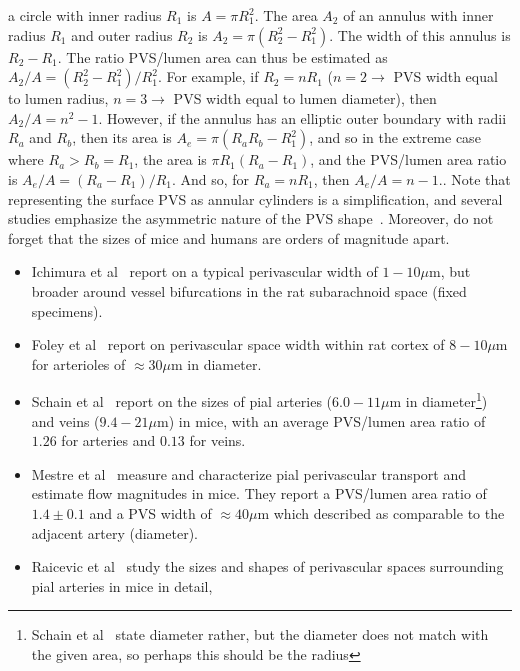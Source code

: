 \documentclass[fleqn,10pt]{wlscirep}
\begin{document}
\begin{enumerate}
{  a circle with inner radius $R_1$ is $A = \pi R_1^2$. The area $A_2$
  of an annulus with inner radius $R_1$ and outer radius $R_2$ is $A_2
  = \pi (R_2^2 - R_1^2)$. The width of this annulus is $R_2 -
  R_1$. The ratio PVS/lumen area can thus be estimated as $A_2/A =
  (R_2^2 - R_1^2)/R_1^2$. For example, if $R_2 = n R_1$ ($n = 2
  \rightarrow$ PVS width equal to lumen radius, $n = 3 \rightarrow$
  PVS width equal to lumen diameter), then $A_2/A = n^2 - 1$. However,
  if the annulus has an elliptic outer boundary with radii $R_a$ and
  $R_b$, then its area is $A_e = \pi (R_a R_b - R_1^2)$, and so in the
  extreme case where $R_a > R_b = R_1$, the area is $\pi R_1 (R_a -
  R_1)$, and the PVS/lumen area ratio is $A_e/A = (R_a -
  R_1)/R_1$. And so, for $R_a = n R_1$, then $A_e/A = n-1$.}. Note
  that representing the surface PVS as annular cylinders is a
  simplification, and several studies emphasize the asymmetric nature
  of the PVS shape~\cite{mestre2018flow, tithof2019hydraulic,
    vinje2021brain, raicevic2023sizes}. Moreover, do not forget that
  the sizes of mice and humans are orders of magnitude apart.
  \begin{itemize}
  \item
    Ichimura et al~\cite{ichimura1991distribution} report on a typical
    perivascular width of $1-10\mu$m, but broader around vessel
    bifurcations in the rat subarachnoid space (fixed specimens).
  \item Foley et al~\cite{foley2012realtime} report on perivascular
    space width within rat cortex of $8-10\mu$m for arterioles of
    $\approx$30$\mu$m in diameter.
  \item
    Schain et al~\cite{schain2017cortical} report on the sizes of pial
    arteries ($6.0-11 \mu$m in diameter\footnote{Schain et
    al~\cite{schain2017cortical} state diameter rather, but the
    diameter does not match with the given area, so perhaps this
    should be the radius}) and veins ($9.4-21\mu$m) in mice, with an
    average PVS/lumen area ratio of $1.26$ for arteries and $0.13$ for
    veins. 
  \item Mestre et al~\cite{mestre2018flow} measure and characterize
    pial perivascular transport and estimate flow magnitudes in
    mice. They report a PVS/lumen area ratio of $1.4 \pm 0.1$ and a
    PVS width of $\approx 40 \mu$m which described as comparable to
    the adjacent artery (diameter). 
\item
  Raicevic et al~\cite{raicevic2023sizes} study the sizes and shapes
  of perivascular spaces surrounding pial arteries in mice in detail,

\end{itemize}
\end{enumerate}
\end{document}
